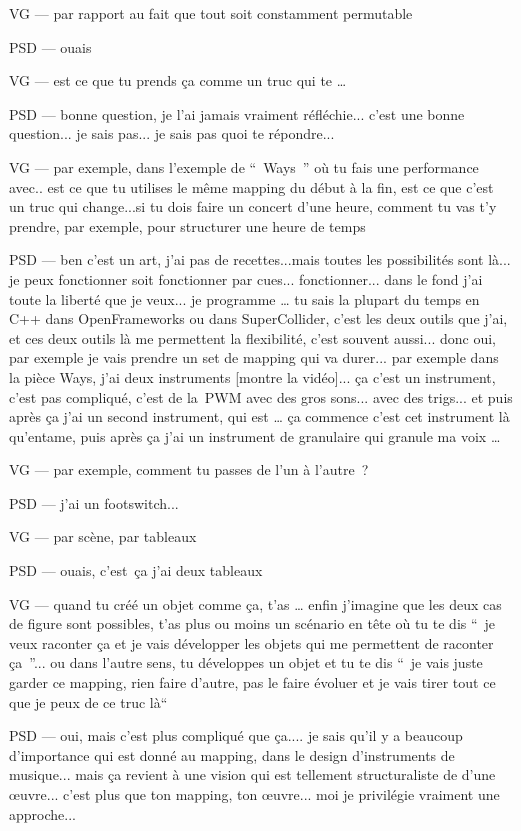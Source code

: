 VG — par rapport au fait que tout soit constamment permutable 

PSD — ouais 

VG — est ce que tu prends ça comme un truc qui te … 

PSD — bonne question, je l'ai jamais vraiment réfléchie... c'est une bonne question... je sais pas... je sais pas quoi te répondre... 

VG — par exemple, dans l'exemple de “ Ways ” où tu fais une performance avec.. est ce que tu utilises le même mapping du début à la fin, est ce que c'est un truc qui change...si tu dois faire un concert d'une heure, comment tu vas t'y prendre,  par exemple, pour structurer une heure de temps  

PSD — ben c'est un art, j'ai pas de recettes...mais toutes les possibilités sont là... je peux fonctionner soit fonctionner par cues... fonctionner... dans le fond j'ai toute la liberté que je veux... je programme … tu sais la plupart du temps en C++ dans OpenFrameworks ou dans SuperCollider, c'est les deux outils que j'ai, et ces deux outils là me permettent la flexibilité, c'est souvent aussi... donc oui, par exemple je vais prendre un set de mapping qui va durer... par exemple dans la pièce Ways, j'ai deux instruments [montre la vidéo]... ça c'est un instrument, c'est pas compliqué, c'est de la PWM avec des gros sons... avec des trigs... et puis après ça j'ai un second instrument, qui est … ça commence c'est cet instrument là qu'entame, puis après ça j'ai un instrument de granulaire qui granule ma voix … 

VG — par exemple, comment tu passes de l'un à l'autre ? 

PSD — j'ai un footswitch... 

VG — par scène, par tableaux 

PSD — ouais, c'est ça j'ai deux tableaux 

VG — quand tu créé un objet comme ça, t'as … enfin j'imagine que les deux cas de figure sont possibles, t'as plus ou moins un scénario en tête où tu te dis “ je veux raconter ça et je vais développer les objets qui me permettent de raconter ça ”... ou dans l'autre sens, tu développes un objet et tu te dis “ je vais juste garder ce mapping, rien faire d'autre, pas le faire évoluer et je vais tirer tout ce que je peux de ce truc là“  

PSD — oui, mais c'est plus compliqué que ça.... je sais qu'il y a beaucoup d'importance qui est donné au mapping, dans le design d'instruments de musique... mais ça revient à une vision qui est tellement structuraliste de d'une œuvre... c'est plus que ton mapping, ton œuvre... moi je privilégie vraiment une approche... 


